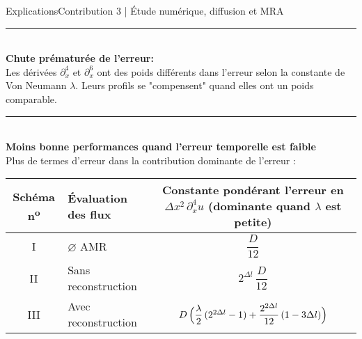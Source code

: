 \begin{frame}{Explications}{Contribution 3 | Étude numérique, diffusion et MRA}
    \noindent\color{Primary}\rule{\linewidth}{0.6pt}\color{black}\\
        \textbf{Chute prématurée de l'erreur: }\\
        Les dérivées $\partial_x^{4}$ et  $\partial_x^{6}$ ont des poids différents dans l’erreur selon la constante de Von Neumann $\lambda$.
        Leurs profils se "compensent" quand elles ont un poids comparable.
    \noindent\color{Primary}\rule{\linewidth}{0.6pt}\color{black}\\
        \textbf{Moins bonne performances quand l'erreur temporelle est faible}\\
            Plus de termes d'erreur dans la contribution dominante de l'erreur : 
            \begin{center}
                \renewcommand{\arraystretch}{1}
                \begin{tabular}{@{}clc@{}}
                    \toprule
                    \textbf{Schéma n\textsuperscript{o}} & \textbf{Évaluation des flux} &
                    \makecell[c]{\textbf{Constante pondérant l'erreur en $\Delta x^{2}\,\partial_{x}^{4}u$}\\
                                \textbf{(dominante quand $\lambda$ est petite)}} \\
                    \midrule
                    I   & $\varnothing$ AMR          & $\dfrac{D}{12}$ \\[1mm]
                    II  & Sans reconstruction         & $2^{\Delta l}\,\dfrac{D}{12}$ \\[1mm]
                    III & Avec reconstruction         &
                        $D\,\Bigl(\dfrac{\lambda}{2}\,(2^{2\Delta l}-1)
                        + \dfrac{2^{2\Delta l}}{12}\,(1-3\Delta l)\Bigr)$ \\[1mm]
                    \bottomrule
                \end{tabular}
            \end{center}
\end{frame}